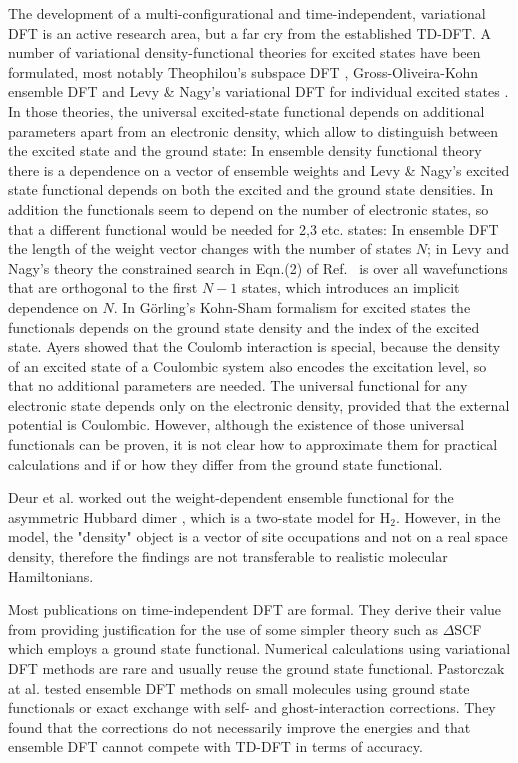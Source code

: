\documentclass[journal=jpclcd,manuscript=letter]{achemso}
\begin{document}
The development of a multi-configurational and time-independent, variational DFT is an active research area,
but a far cry from the established TD-DFT.
A number of variational density-functional theories for excited states have been formulated, most notably
Theophilou's subspace DFT \cite{Theophilou1979}, Gross-Oliveira-Kohn ensemble DFT \cite{Gross1988ReyleighRitz} and
Levy \& Nagy's variational DFT for individual excited states \cite{Levy1999}.
In those theories, the universal excited-state functional depends on additional parameters apart from an electronic density,
which allow to distinguish between the excited state and the ground state: In ensemble density functional theory
\cite{Gross1988ReyleighRitz,Gross1988EnsembleDFT} there is a dependence on a vector of ensemble weights
and Levy \& Nagy's excited state functional \cite{Levy1999} depends on both the excited and the ground state densities.
In addition the functionals seem to depend on
the number of electronic states, so that a different functional would be needed for 2,3 etc. states:
In ensemble DFT the length of the weight vector changes with the number of states $N$;
in Levy and Nagy's theory the constrained search in Eqn.(2) of Ref.~\cite{Levy1999} is over all wavefunctions that are orthogonal
to the first $N-1$ states, which introduces an implicit dependence on $N$.
In G\"{o}rling's Kohn-Sham formalism for excited states the functionals
depends on the ground state density and the index of the excited state. \cite{Goerling1996density}
Ayers showed that the Coulomb interaction is special, because the density of an excited state of a Coulombic system also encodes
the excitation level, so that no additional parameters are needed. \cite{Ayers2012} The universal functional for
any electronic state depends only on the electronic density, provided that the external potential is Coulombic. \cite{Ayers2012}
However, although the existence of those universal functionals can be proven,
it is not clear how to approximate them for practical calculations
and if or how they differ from the ground state functional.

Deur et al. worked out the weight-dependent ensemble functional for the asymmetric Hubbard dimer \cite{Deur2017},
which is a two-state model for H$_2$. However, in the model, the "density" object is a vector of site occupations
and not on a real space density, therefore the findings are not transferable to realistic molecular Hamiltonians.

Most publications on time-independent DFT are formal. They derive their value from providing justification for
the use of some simpler theory such as $\Delta$SCF which employs a ground state functional.
Numerical calculations using variational DFT methods are rare and usually reuse the ground state functional.
Pastorczak at al. tested ensemble DFT methods on small molecules using ground state functionals or exact exchange
with self- and ghost-interaction corrections. \cite{Pastorczak2014} They found that the corrections
do not necessarily improve the energies and that ensemble DFT cannot compete with TD-DFT in terms of accuracy. \cite{Pastorczak2014}
\end{document}

